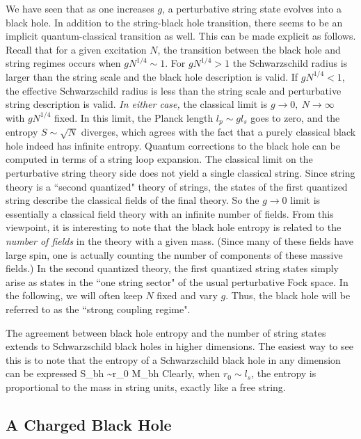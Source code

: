 We have seen that as one increases $g$, a perturbative string state
evolves into a black hole.
In addition to the string-black hole transition,
there seems to be an implicit quantum-classical transition as well.
This can be made explicit as follows. Recall that for a given excitation $N$, 
the transition between the black hole and string regimes
occurs when $g N^{1/4} \sim 1$. For $g N^{1/4} > 1$ the
Schwarzschild radius is larger than the string scale and the black hole
description is valid. If $g N^{1/4}<1$, the
effective Schwarzschild radius is less than the string scale and
perturbative string description is valid. {\it In either case,} the
classical limit is $g\rightarrow 0,\ N\rightarrow \infty$ with
$g N^{1/4}$ fixed. In this limit, the Planck length $l_p \sim g l_s$
goes to zero, and the entropy $S \sim \sqrt N$ diverges, which agrees
with the fact that a purely classical black hole indeed has infinite
entropy. Quantum corrections to the black 
hole can be computed in terms of a string loop expansion. 
The classical limit on the
perturbative string theory side does not yield a single classical string.
Since string theory is a ``second quantized" theory of strings, the states of
the first 
quantized string describe the classical fields of the final theory. 
So the $g\to0$ limit is essentially a classical field theory with an
infinite number of fields. From this viewpoint,
it is interesting to note that the
black hole entropy is related to the {\it number of fields} in the theory
with a given mass. (Since many of these fields have large spin, one is
actually counting the number of components of these massive fields.)
In the second quantized theory, the first quantized string
states simply arise as states in the ``one string sector" of the
usual perturbative 
Fock space. 
In the following, we will often keep $N$ fixed and vary $g$. Thus, the
black hole will be referred to as the ``strong coupling regime".


The agreement between black hole entropy and the number of string
states  extends to Schwarzschild black holes in higher dimensions.
The easiest way to see this is to note that the entropy of a
Schwarzschild black hole in any dimension can be expressed 
\eq
S_{bh} \sim r_0 M_{bh}
\eqe
Clearly, when $r_0 \sim l_s$, the entropy
is proportional to the mass in string units, exactly like a free string.

\subsection{A Charged Black Hole}


